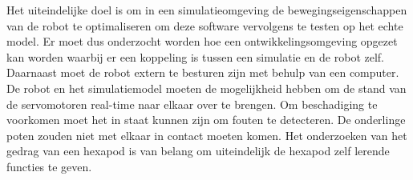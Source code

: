 \documentclass[10pt,a4paper]{article}
\begin{document}
Het uiteindelijke doel is om in een simulatieomgeving de bewegingseigenschappen van de robot te optimaliseren om deze software vervolgens te testen op het echte model. Er moet dus onderzocht worden hoe een ontwikkelingsomgeving opgezet kan worden waarbij er een koppeling is tussen een simulatie en de robot zelf. Daarnaast moet de robot extern te besturen zijn met behulp van een computer. De robot en het simulatiemodel moeten de mogelijkheid hebben om de stand van de servomotoren real-time naar elkaar over te brengen. Om beschadiging te voorkomen moet het in staat kunnen zijn om fouten te detecteren. De onderlinge poten zouden niet met elkaar in contact moeten komen. Het onderzoeken van het gedrag van een hexapod is van belang om uiteindelijk de hexapod zelf lerende functies te geven.
\newpage

\iffalse %
\textbf{Hoofdvraag\\}
De hoofdvraag van het onderzoek betreft:
Hoe wordt een ontwikkelingsomgeving opgezet waarbij een robot aan een simulatie gekoppeld wordt?

\textbf{Deelvragen\\}
De onderzoeksvraag is onder te verdelen in verschillende deelvragen:
\begin{itemize}
\setlength\itemsep{0em}
\item Wat is een hexapod?
\item Welke draadloze techniek kan het beste worden toegepast als communicatiemiddel?
\item Wat zijn effici\"ente looppatronen voor een hexapod op verschillende oppervlakken?
\item Is een hexapod in staat om zich voort te bewegen met één of meerdere beperkingen aan zijn poten?
\item Zijn er effici\"entere looppatronen bij een zwaardere belasting van de hexapod?
\item Zijn er verschillen tussen de simulatie en de werkelijkheid?
\item Hoe detecteert de hexapod dat er een onmogelijke bewegingsactie uitgevoerd moet worden?
\item Hoe verkent de hexapod zijn omgeving en onderscheid deze objecten van elkaar?
\item Kan de robot zich voortbewegen ongeacht de orie\"entatie?
\end{itemize}
\fi

\iffalse %
\end{document}
